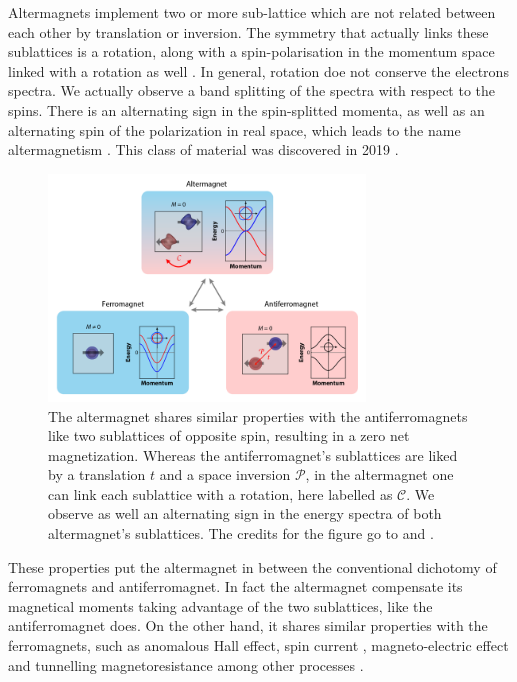 \documentclass[../main.tex]{main.tex}
\begin{document}
Altermagnets implement two or more sub-lattice which are not related between each other by translation or inversion.
The symmetry that actually links these sublattices is a rotation,
along with a spin-polarisation in the momentum space linked with a rotation as well \cite{Smejkal2022}.
In general, rotation doe not conserve the electrons spectra. We actually observe a band splitting of the spectra with respect to the spins.
There is an alternating sign in the spin-splitted momenta, as well as an alternating spin of the polarization in real space,
which leads to the name altermagnetism \cite{Smejkal2022_2}. This class of material was discovered in 2019 \cite{Hayami2019}.
\begin{figure}[H]
    \centering
    \includegraphics[width = 0.75\textwidth]{Ressources/AM.png}
    \caption{The altermagnet shares similar properties with the antiferromagnets like two sublattices of opposite spin, resulting in a zero net
    magnetization. Whereas the antiferromagnet's sublattices are liked by a translation $t$ and a space inversion $\mathcal{P}$, in the altermagnet one can link
    each sublattice with a rotation, here labelled as $\mathcal{C}$. We observe as well an alternating sign in the energy spectra of both altermagnet's sublattices. 
    The credits for the figure go to \cite{Smejkal2022} and \cite{Stonebraker}.}
\end{figure}


These properties put the altermagnet in between
the conventional dichotomy of ferromagnets and antiferromagnet. In fact the altermagnet compensate its magnetical moments taking advantage of the two
sublattices, like the antiferromagnet does. On the other hand, it shares similar properties with the ferromagnets, such as anomalous Hall effect,
spin current \cite{Naka2021_2}, magneto-electric effect \cite{Smejkal2022_3} and tunnelling magnetoresistance \cite{Smejkal2022_4} among other processes \cite{Smejkal2022_2}.\\
\end{document}
